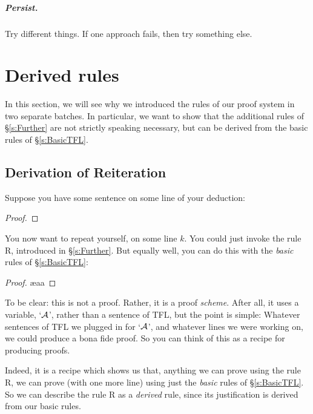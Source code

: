 \paragraph{Persist.}
Try different things. If one approach fails, then try something else.


\chapter{Derived rules}\label{s:Derived}
In this section, we will see why we introduced the rules of our proof system in two separate batches. In particular, we want to show that the additional rules of \S\ref{s:Further} are not strictly speaking necessary, but can be derived from the basic rules of \S\ref{s:BasicTFL}.

\section{Derivation of Reiteration}
Suppose you have some sentence on some line of your deduction:
\begin{proof}
\end{proof}
You now want to repeat yourself, on some line $k$. You could just invoke the rule R, introduced in \S\ref{s:Further}. But equally well, you can do this with the \emph{basic} rules of \S\ref{s:BasicTFL}:
\begin{proof}
	\ae{aa}
\end{proof}
To be clear: this is not a proof. Rather, it is a proof  \emph{scheme}. After all, it uses a variable, `$\mathcal{A}$', rather than a sentence of TFL, but the point is simple: Whatever sentences of TFL we plugged in for `$\mathcal{A}$', and whatever lines we were working on, we could produce a bona fide proof. So you can think of this as a recipe for producing proofs. 

Indeed, it is a recipe which shows us that, anything we can prove using the rule R, we can prove (with one more line) using just the \emph{basic} rules of \S\ref{s:BasicTFL}. So we can describe the rule R as a \emph{derived} rule, since its justification is derived from our basic rules.



